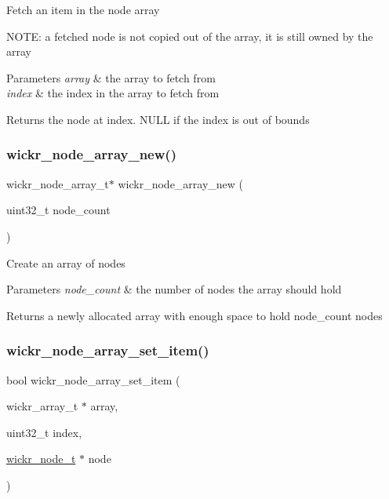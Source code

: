 Fetch an item in the node array

N\+O\+TE\+: a fetched node is not copied out of the array, it is still owned by the array


\begin{DoxyParams}{Parameters}
{\em array} & the array to fetch from \\
\hline
{\em index} & the index in the array to fetch from \\
\hline
\end{DoxyParams}
\begin{DoxyReturn}{Returns}
the node at \textquotesingle{}index\textquotesingle{}. N\+U\+LL if the index is out of bounds 
\end{DoxyReturn}
\mbox{\label{group__wickr__node_ga504ebe707aa003032c4ac8044d73ee92}} 
\subsubsection{\texorpdfstring{wickr\_node\_array\_new()}{wickr\_node\_array\_new()}}
{\footnotesize\ttfamily wickr\+\_\+node\+\_\+array\+\_\+t$\ast$ wickr\+\_\+node\+\_\+array\+\_\+new (\begin{DoxyParamCaption}\item[{uint32\+\_\+t}]{node\+\_\+count }\end{DoxyParamCaption})}

Create an array of nodes


\begin{DoxyParams}{Parameters}
{\em node\+\_\+count} & the number of nodes the array should hold \\
\hline
\end{DoxyParams}
\begin{DoxyReturn}{Returns}
a newly allocated array with enough space to hold \textquotesingle{}node\+\_\+count\textquotesingle{} nodes 
\end{DoxyReturn}
\mbox{\label{group__wickr__node_gae511a75489982fc2e90271be63d9d753}} 
\subsubsection{\texorpdfstring{wickr\_node\_array\_set\_item()}{wickr\_node\_array\_set\_item()}}
{\footnotesize\ttfamily bool wickr\+\_\+node\+\_\+array\+\_\+set\+\_\+item (\begin{DoxyParamCaption}\item[{wickr\+\_\+array\+\_\+t $\ast$}]{array,  }\item[{uint32\+\_\+t}]{index,  }\item[{\mbox{\hyperlink{structwickr__node}{wickr\+\_\+node\+\_\+t}} $\ast$}]{node }\end{DoxyParamCaption})}

